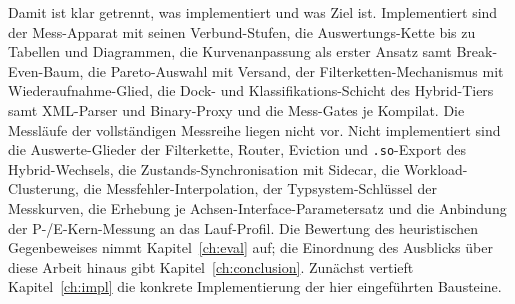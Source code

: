 \begin{nurlang}
Damit ist klar getrennt, was implementiert und was Ziel ist. Implementiert sind der Mess-Apparat mit seinen
Verbund-Stufen, die Auswertungs-Kette bis zu Tabellen und Diagrammen, die Kurvenanpassung als erster Ansatz samt
Break-Even-Baum, die Pareto-Auswahl mit Versand, der Filterketten-Mechanismus mit Wiederaufnahme-Glied,
die Dock- und Klassifikations-Schicht des Hybrid-Tiers samt XML-Parser und Binary-Proxy und die
Mess-Gates je Kompilat.
Die Messläufe der vollständigen Messreihe liegen nicht vor. Nicht implementiert sind die Auswerte-Glieder der
Filterkette, Router, Eviction und \texttt{.so}-Export des Hybrid-Wechsels, die Zustands-Synchronisation mit Sidecar,
die Workload-Clusterung, die Messfehler-Interpolation, der Typsystem-Schlüssel der Messkurven, die
Erhebung je Achsen-Interface-Parametersatz und die Anbindung der P-/E-Kern-Messung an das Lauf-Profil. Die
Bewertung des heuristischen Gegenbeweises nimmt Kapitel~\ref{ch:eval} auf; die Einordnung des Ausblicks
über diese Arbeit hinaus gibt Kapitel~\ref{ch:conclusion}. Zunächst vertieft Kapitel~\ref{ch:impl} die
konkrete Implementierung der hier eingeführten Bausteine.
\end{nurlang}
